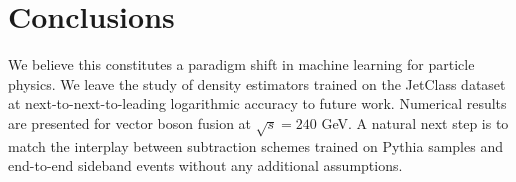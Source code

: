 \section{Conclusions}\label{sec:conclusions}

We believe this constitutes a paradigm shift in machine learning for
particle physics. We leave the study of density estimators trained on
the JetClass dataset at next-to-next-to-leading logarithmic accuracy to
future work. Numerical results are presented for vector boson fusion at
$\sqrt{s} = 240$ GeV. A natural next step is to match the interplay
between subtraction schemes trained on Pythia samples and end-to-end
sideband events without any additional assumptions.

